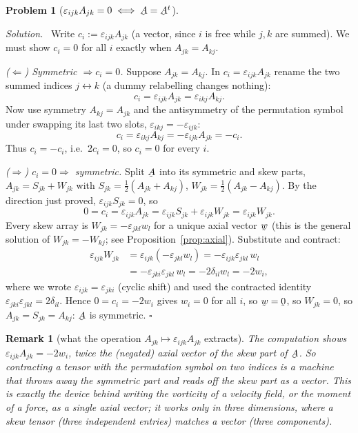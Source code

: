 \documentclass[17pt,a4paper]{extreport}
\DeclareRobustCommand{\vek}[1]{\underaccent{\tilde}{#1}}
\newcommand{\bw}{\vek{w}}
\newcommand{\bze}{\vek{0}}
\newcommand{\bA}{\vek{A}}
\newcommand{\dd}{\delta}
\newcommand{\eps}{\varepsilon}
\theoremstyle{scplain}
\theoremstyle{scdefn}
\newtheorem{remark}[theorem]{Remark}
\theoremstyle{scplain}
\newtheorem{problem}{Problem}
\newenvironment{solution}
 {\par\smallskip\noindent\textit{Solution.}\ }
 {\hfill$\square$\par\medskip}
\begin{document}
\begin{problem}[$\eps_{ijk}A_{jk}=0\iff\bA=\bA^{t}$]
\end{problem}
\begin{solution}
Write $c_i:=\eps_{ijk}A_{jk}$ (a vector, since $i$ is free while $j,k$ are
summed). We must show $c_i=0$ for all $i$ exactly when $A_{jk}=A_{kj}$.

\emph{($\Leftarrow$) Symmetric $\Rightarrow c_i=0$.} Suppose $A_{jk}=A_{kj}$.
In $c_i=\eps_{ijk}A_{jk}$ rename the two summed indices $j\leftrightarrow k$
(a dummy relabelling changes nothing):
\[
c_i=\eps_{ijk}A_{jk}=\eps_{ikj}A_{kj}.
\]
Now use symmetry $A_{kj}=A_{jk}$ and the antisymmetry of the permutation
symbol under swapping its last two slots, $\eps_{ikj}=-\eps_{ijk}$:
\[
c_i=\eps_{ikj}A_{kj}=-\eps_{ijk}A_{jk}=-c_i .
\]
Thus $c_i=-c_i$, i.e.\ $2c_i=0$, so $c_i=0$ for every $i$.

\emph{($\Rightarrow$) $c_i=0\Rightarrow$ symmetric.} Split $\bA$ into its
symmetric and skew parts, $A_{jk}=S_{jk}+W_{jk}$ with
$S_{jk}=\tfrac12(A_{jk}+A_{kj})$, $W_{jk}=\tfrac12(A_{jk}-A_{kj})$. By the
direction just proved, $\eps_{ijk}S_{jk}=0$, so
\[
0=c_i=\eps_{ijk}A_{jk}=\eps_{ijk}S_{jk}+\eps_{ijk}W_{jk}=\eps_{ijk}W_{jk}.
\]
Every skew array is $W_{jk}=-\eps_{jkl}w_l$ for a unique axial vector $\bw$
(this is the general solution of $W_{jk}=-W_{kj}$; see
Proposition~\ref{prop:axial}). Substitute and contract:
\[
\begin{aligned}
\eps_{ijk}W_{jk}&=\eps_{ijk}(-\eps_{jkl}w_l)=-\eps_{ijk}\eps_{jkl}\,w_l\\
&=-\eps_{jki}\eps_{jkl}\,w_l=-2\dd_{il}w_l=-2w_i,
\end{aligned}
\]
where we wrote $\eps_{ijk}=\eps_{jki}$ (cyclic shift) and used the contracted
identity $\eps_{jki}\eps_{jkl}=2\dd_{il}$. Hence $0=c_i=-2w_i$ gives
$w_i=0$ for all $i$, so $\bw=\bze$, so $W_{jk}=0$, so $A_{jk}=S_{jk}=A_{kj}$:
$\bA$ is symmetric.
\end{solution}

\begin{remark}[what the operation $A_{jk}\mapsto\eps_{ijk}A_{jk}$ extracts]\label{rem:p5use}
The computation shows $\eps_{ijk}A_{jk}=-2w_i$, twice the (negated) axial
vector of the skew part of $\bA$. So contracting a tensor with the
permutation symbol on two indices is a machine that \emph{throws away the
symmetric part and reads off the skew part as a vector}. This is exactly the
device behind writing the vorticity of a velocity field, or the moment of a
force, as a single axial vector; it works only in three dimensions, where a
skew tensor (three independent entries) matches a vector (three
components).
\end{remark}
\end{document}
